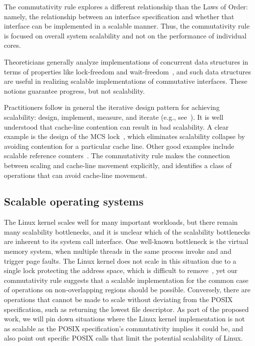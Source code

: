 The commutativity rule explores a different relationship
than the Laws of Order: namely, the relationship between an interface
specification and whether that interface can be implemented in a scalable
manner.  Thus, the commutativity rule is focused on overall system
scalability and not on the performance of individual cores.

Theoreticians generally analyze implementations of concurrent
data structures in terms of properties like lock-freedom and
wait-freedom~\cite{herlihy:art}, and such data structures are useful in
realizing scalable implementations of commutative interfaces.
These notions guarantee progress, but not scalability.


Practitioners follow in general the iterative design pattern for
achieving scalability: design, implement, measure, and iterate (e.g.,
see~\cite{cacm-real-world}).  It is well understood that cache-line
contention can result in bad scalability. A clear example is the design of
the MCS lock~\cite{MCS}, which eliminates scalability collapse by avoiding
contention for a particular cache line.  Other good examples include
scalable reference counters~\cite{approx:counter,snzi:podc}.
The commutativity rule makes the connection between scaling and cache-line
movement explicitly, and identifies a class of operations that can avoid
cache-line movement.

\subsection{Scalable operating systems}

The Linux kernel scales well for many important workloads, but
there remain many scalability bottlenecks, and it is unclear which
of the scalability bottlenecks are inherent to its system call interface.
One well-known bottleneck is the virtual memory system, when multiple
threads in the same process invoke  and  and
trigger page faults.  The Linux kernel does not scale in this situation
due to a single lock protecting the address space, which is difficult
to remove~\cite{clements:bonsai}, yet our commutativity rule suggests
that a scalable implementation for the common case of operations on
non-overlapping regions should be possible.  Conversely, there are
operations that cannot be made to scale without deviating from the POSIX
specification,
such as  returning the lowest file descriptor.
As part of the proposed work, we will pin down situations where the
Linux kernel implementation is not as scalable as the POSIX specification's
commutativity
implies it could be, and also point out specific POSIX calls that limit
the potential scalability of Linux.

